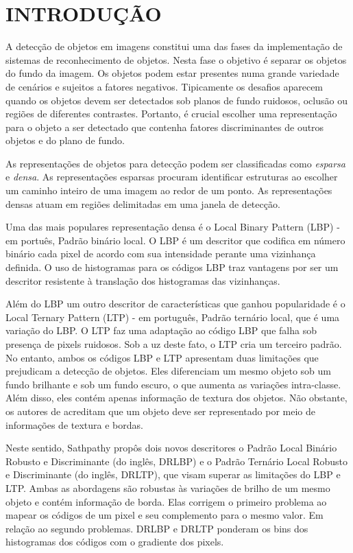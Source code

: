 \documentclass[a4paper,twocolumn]{article}
\begin{document}
\section{INTRODUÇÃO}
\label{rule_based}


A detecção de objetos em imagens constitui uma das fases da implementação de sistemas de reconhecimento de objetos. Nesta fase o objetivo é separar os objetos do fundo da imagem. Os objetos podem estar presentes numa grande variedade de cenários e sujeitos a fatores negativos. Tipicamente os desafios aparecem quando os objetos devem ser detectados sob planos de fundo ruidosos, oclusão ou regiões de diferentes contrastes. Portanto, é crucial escolher uma representação para o objeto a ser detectado que contenha fatores discriminantes de outros objetos e do plano de fundo\cite{satpathy}. 

As representações de objetos para detecção podem ser classificadas como \textit{esparsa} e \textit{densa}\cite{chen}. As representações esparsas procuram identificar estruturas ao escolher um caminho inteiro de uma imagem ao redor de um ponto. As representações densas atuam em regiões delimitadas em uma janela de detecção.

Uma das mais populares representação densa é o Local Binary Pattern (LBP) - em portuês, Padrão binário local. O LBP é um descritor que codifica em número binário cada pixel de acordo com sua intensidade perante uma vizinhança definida. O uso de histogramas para os códigos LBP traz vantagens por ser um descritor resistente à translação dos histogramas das vizinhanças\cite{satpathy}. 

Além do LBP um outro descritor de características que ganhou popularidade é o Local Ternary Pattern (LTP) - em português, Padrão ternário local, que é uma variação do LBP. O LTP faz uma adaptação ao código LBP que falha sob presença de pixels ruidosos. Sob a uz deste fato, o LTP cria um terceiro padrão. No entanto, ambos os códigos LBP e LTP apresentam duas limitações que prejudicam a detecção de objetos. Eles diferenciam um mesmo objeto sob um fundo brilhante e sob um fundo escuro, o que aumenta as variações intra-classe\cite{satpathy}. Além disso, eles contém apenas informação de textura dos objetos. Não obstante, os autores de \cite{satpathy} acreditam que um objeto deve ser representado por meio de informações de textura e bordas. 

Neste sentido, Sathpathy \cite{satpathy} propôs dois novos descritores o Padrão Local Binário Robusto e Discriminante (do inglês, DRLBP) e o Padrão Ternário Local Robusto e Discriminante (do inglês, DRLTP), que visam superar as limitações do LBP e LTP. Ambas as abordagens são robustas às variações de brilho de um mesmo objeto e contém informação de borda. Elas corrigem o primeiro  problema ao mapear os códigos de um pixel e seu complemento para o mesmo valor. Em relação ao segundo problemas. DRLBP e DRLTP ponderam os bins dos histogramas dos códigos com o gradiente dos pixels.
\end{document}
